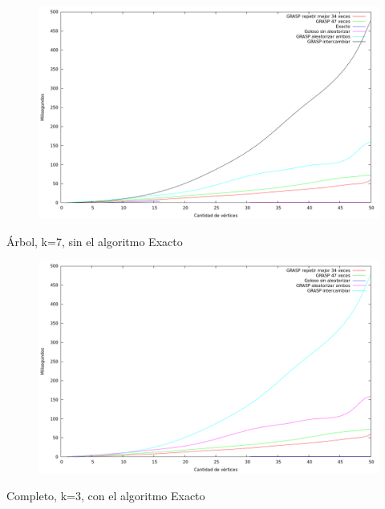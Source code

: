 \begin{figure}[H]
  \begin{center}
    \includegraphics[scale=0.35]{imagenes/ej6-arbol-k7-tiempo-exacto.png}
  \end{center}
\end{figure}

Árbol, k=7, sin el algoritmo Exacto

\begin{figure}[H]
  \begin{center}
    \includegraphics[scale=0.35]{imagenes/ej6-arbol-k7-tiempo.png}
  \end{center}
\end{figure}

Completo, k=3, con el algoritmo Exacto

